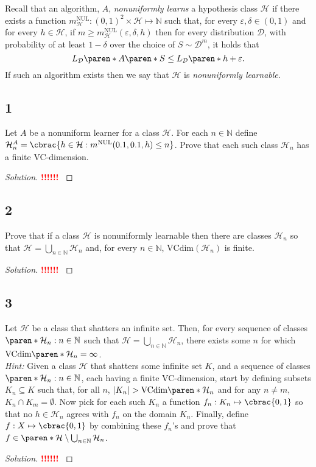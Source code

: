 \documentclass[10pt, a4paper, twoside]{amsart}
\theoremstyle{plain}
\newcommand{\N}{\ensuremath{\mathbb{N}}}
\DeclarePairedDelimiter\abs{\lvert}{\rvert}
\DeclarePairedDelimiter\cbrac\{\}
\DeclarePairedDelimiter\paren()
\newcommand{\cH}{\ensuremath{\mathcal{H}}}
\newcommand{\cD}{\ensuremath{\mathcal{D}}}
\newenvironment{solution}
               {\let\oldqedsymbol=\qedsymbol
                \renewcommand{\qedsymbol}{$\blacktriangleleft$}
                \begin{proof}[Solution]}
               {\end{proof}
                \renewcommand{\qedsymbol}{\oldqedsymbol}}
\newcommand{\TODO}{\textcolor{red}{\textbf{!!!!!! }}}
\begin{document}
Recall that an algorithm, $A$, \textit{nonuniformly learns} a hypothesis class $\cH$ if there exists a function $m_{\cH}^{\text{NUL}}:(0,1)^2 \times \cH \mapsto \N$ such that, for every $\varepsilon, \delta \in (0,1)$ and for every $h \in \cH$, if $m \geq m_{\cH}^{\text{NUL}}(\varepsilon, \delta, h)$ then for every distribution $\cD$, with probability of at least $1-\delta$ over the choice of $S \sim \cD^m$, it holds that
\begin{equation*}
  L_{\cD}\paren*{A\paren*{S}} \leq L_{\cD}\paren*{h} + \varepsilon.
\end{equation*}
If such an algorithm exists then we say that $\cH$ is \textit{nonuniformly learnable}.
\subsection*{1}
Let $A$ be a nonuniform learner for a class $\cH$. For each $n \in \N$ define $\cH_n^A = \cbrac{ h \in \cH : m^{\text{NUL}}(0.1,0.1,h)\leq n}$. Prove that each such class $\cH_n$ has a finite VC-dimension.
\begin{solution}
\TODO
\end{solution}
\subsection*{2}
Prove that if a class $\cH$ is nonuniformly learnable then there are classes $\cH_n$ so that $\cH = \bigcup_{n \in \N}\cH_n$ and, for every $n \in \N$, $\text{VCdim}(\cH_n)$ is finite.
\begin{solution}
\TODO
\end{solution}
\subsection*{3}
Let $\cH$ be a class that shatters an infinite set. Then, for every sequence of classes $\paren*{\cH_n : n \in \N}$ such that $\cH = \bigcup_{n \in \N} \cH_n$, there exists some $n$ for which $\text{VCdim} \paren*{\cH_n} = \infty$.\\
\textit{Hint:} Given a class $\cH$ that shatters some infinite set $K$, and a sequence of classes $\paren*{\cH_n : n \in \N}$, each having a finite VC-dimension, start by defining subsets $K_n \subseteq K$ such that, for all $n$, $\abs*{K_n} > \text{VCdim} \paren*{\cH_n}$ and for any $n \neq m$, $K_n \cap K_m = \emptyset$. Now pick for each such $K_n$ a function $f_n : K_n \mapsto \cbrac{0,1}$ so that no $h \in \cH_n$ agrees with $f_n$ on the domain $K_n$. Finally, define $f : X \mapsto \cbrac{0,1}$ by combining these $f_n$'s and prove that $f \in \paren*{\cH \setminus \bigcup_{n \in \N} \cH_n}$.
\begin{solution}
\TODO
\end{solution}
\end{document}
